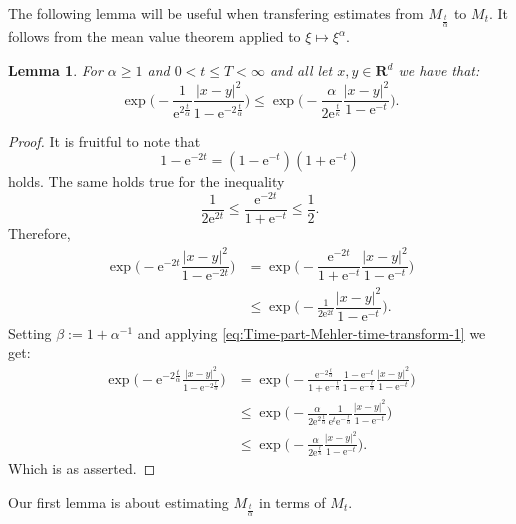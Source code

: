 \documentclass[a4paper,oneside,10pt]{amsproc}
\newtheorem{lemma}{Lemma}
\theoremstyle{remark}
\renewcommand{\leq}{\leqslant}
\renewcommand{\leq}{\leqslant}
\renewcommand{\geq}{\geqslant}
\newcommand{\R}{\mathbf R}
\newcommand{\e}{\mathrm{e}} %
\renewcommand{\leq}{\leqslant}%
\renewcommand{\geq}{\geqslant}%
\begin{document}
The following lemma will be useful when transfering estimates from
$M_{\frac{t}{\alpha}}$ to $M_t$. It follows from the mean value
theorem applied to $\xi \mapsto \xi^\alpha$.
\begin{lemma}\label{lem:Exponential-estimates}
  For $\alpha \geq 1$ and $0 < t \leq T < \infty$ and all let $x, y \in \R^d$
  we have that:
  \begin{equation}
    \label{eq:Exponential-estimates-1}
    \exp \biggl (-\frac1{\e^{2\frac{t}\alpha}} \frac{|x - y|^2}{1 - \e^{-2\frac{t}\alpha}}
    \biggr ) \leq \exp \biggl(-\frac{\alpha}{2\e^{\frac{t}\kappa}} \frac{|x -
      y|^2}{1 - \e^{-t}} \biggr).
  \end{equation}
\end{lemma}
\begin{proof}
  It is fruitful to note that
  \begin{equation*}
    1 - \e^{-2t} = (1 - \e^{-t})(1 + \e^{-t})
  \end{equation*}
  holds. The same holds true for the inequality
  \begin{equation*}
    \frac1{2 \e^{2t}} \leq \frac{\e^{-2t}}{1 + \e^{-t}} \leq \frac12.
  \end{equation*}
  Therefore,
  \begin{align*}
    \exp\biggl(-\e^{-2t} \dfrac{|x - y|^2}{1 - \e^{-2 t}} \biggr)
    &= \exp\biggl(-\dfrac{\e^{-2t}}{1 + \e^{-t}} \dfrac{|x -
      y|^2}{1 - \e^{-t}} \biggr)\\
    &\leq \exp\biggl(-\frac1{2\e^{2t}} \dfrac{|x - y|^2}{1 - \e^{-t}} \biggr).
  \end{align*}
  Setting $\beta := 1 + \alpha^{-1}$ and applying \eqref{eq:Time-part-Mehler-time-transform-1} we get:
  \begin{align*}
    \exp \biggl (-\e^{-2\frac{t}\alpha} \frac{|x - y|^2}{1 - \e^{-2\frac{t}\alpha}}
    \biggr ) &= \exp \biggl (-\frac{\e^{-2\frac{t}\alpha}}{1 + \e^{-\frac{t}\alpha}} \frac{1 - \e^{-t}}{1 -
      \e^{-\frac{t}\alpha}}  \frac{|x - y|^2}{1 - \e^{-t}} \biggr )\\
    &\leq \exp \biggl(-\frac{\alpha}{2\e^{2\frac{t}{\alpha}}}
    \frac1{\e^t \e^{-\frac{t}\alpha}} \frac{|x - y|^2}{1 - \e^{-t}}
    \biggr)\\
    &\leq \exp \biggl(-\frac{\alpha}{2\e^{\frac{t}\kappa}} \frac{|x - y|^2}{1
      - \e^{-t}} \biggr).
  \end{align*}
  Which is as asserted.
\end{proof}
Our first lemma is about estimating $M_{\frac{t}\alpha}$ in terms of
$M_{t}$.
\end{document}
